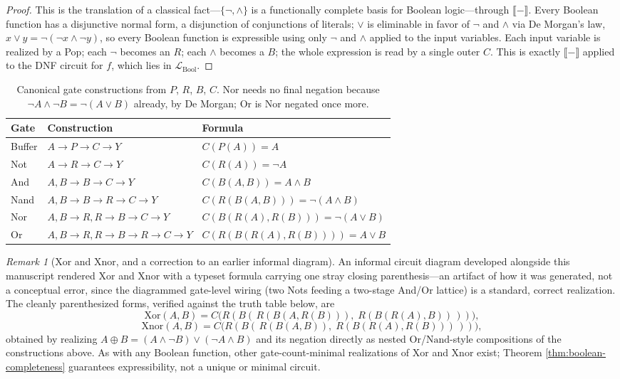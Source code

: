 \documentclass[12pt, a4paper, openany]{book}
\theoremstyle{plain}
\theoremstyle{definition}
\theoremstyle{remark}
\newtheorem{remark}[theorem]{Remark}
\begin{document}
\begin{proof}
This is the translation of a classical fact---$\{\neg, \wedge\}$ is a
functionally complete basis for Boolean logic---through
$\llbracket - \rrbracket$. Every Boolean function has a disjunctive normal
form, a disjunction of conjunctions of literals; $\vee$ is eliminable in favor
of $\neg$ and $\wedge$ via De Morgan's law, $x \vee y = \neg(\neg x \wedge \neg
y)$, so every Boolean function is expressible using only $\neg$ and $\wedge$
applied to the input variables. Each input variable is realized by a Pop; each
$\neg$ becomes an $R$; each $\wedge$ becomes a $B$; the whole expression is
read by a single outer $C$. This is exactly $\llbracket - \rrbracket$ applied
to the DNF circuit for $f$, which lies in $\mathcal{L}_{\mathrm{Bool}}$.
\end{proof}

\begin{table}[h]
\centering
\begin{tabular}{lll}
\toprule
Gate & Construction & Formula \\
\midrule
Buffer & $A \to P \to C \to Y$ & $C(P(A)) = A$ \\
Not & $A \to R \to C \to Y$ & $C(R(A)) = \neg A$ \\
And & $A, B \to B \to C \to Y$ & $C(B(A,B)) = A \wedge B$ \\
Nand & $A, B \to B \to R \to C \to Y$ & $C(R(B(A,B))) = \neg(A \wedge B)$ \\
Nor & $A, B \to R, R \to B \to C \to Y$ & $C(B(R(A),R(B))) = \neg(A \vee B)$ \\
Or & $A, B \to R, R \to B \to R \to C \to Y$ & $C(R(B(R(A),R(B)))) = A \vee B$ \\
\bottomrule
\end{tabular}
\caption{Canonical gate constructions from $P$, $R$, $B$, $C$. Nor needs no
final negation because $\neg A \wedge \neg B = \neg(A \vee B)$ already, by De
Morgan; Or is Nor negated once more.}
\end{table}

\begin{remark}[Xor and Xnor, and a correction to an earlier informal diagram]
An informal circuit diagram developed alongside this manuscript rendered Xor
and Xnor with a typeset formula carrying one stray closing parenthesis---an
artifact of how it was generated, not a conceptual error, since the diagrammed
gate-level wiring (two Nots feeding a two-stage And/Or lattice) is a standard,
correct realization. The cleanly parenthesized forms, verified against the
truth table below, are
\[
\mathrm{Xor}(A,B) = C\bigl(R(B(\,R(B(A,R(B))),\; R(B(R(A),B))\,))\bigr),
\]
\[
\mathrm{Xnor}(A,B) = C\bigl(R(B(\,R(B(A,B)),\; R(B(R(A),R(B)))\,))\bigr),
\]
obtained by realizing $A \oplus B = (A \wedge \neg B) \vee (\neg A \wedge B)$
and its negation directly as nested $\mathrm{Or}$/$\mathrm{Nand}$-style
compositions of the constructions above. As with any Boolean function, other
gate-count-minimal realizations of Xor and Xnor exist; Theorem
\ref{thm:boolean-completeness} guarantees expressibility, not a unique or
minimal circuit.
\end{remark}
\end{document}
